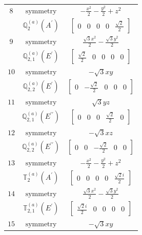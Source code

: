 \documentclass[fleqn,8pt,landscape]{jsarticle}
\begin{document}
\begin{longtable}{ccc}
$ 8 $ & $ \text{symmetry} $ & $ - \frac{x^{2}}{2} - \frac{y^{2}}{2} + z^{2} $ \\
$  $ & $ \mathbb{Q}_{2}^{(a)}(A^{\prime}) $ & $ \begin{bmatrix} 0 & 0 & 0 & 0 & \frac{\sqrt{2}}{2} \end{bmatrix} $ \\ \hline
$ 9 $ & $ \text{symmetry} $ & $ \frac{\sqrt{3} x^{2}}{2} - \frac{\sqrt{3} y^{2}}{2} $ \\
$  $ & $ \mathbb{Q}_{2,1}^{(a)}(E^{\prime}) $ & $ \begin{bmatrix} \frac{\sqrt{2}}{2} & 0 & 0 & 0 & 0 \end{bmatrix} $ \\ \hline
$ 10 $ & $ \text{symmetry} $ & $ - \sqrt{3} x y $ \\
$  $ & $ \mathbb{Q}_{2,2}^{(a)}(E^{\prime}) $ & $ \begin{bmatrix} 0 & - \frac{\sqrt{2}}{2} & 0 & 0 & 0 \end{bmatrix} $ \\ \hline
$ 11 $ & $ \text{symmetry} $ & $ \sqrt{3} y z $ \\
$  $ & $ \mathbb{Q}_{2,1}^{(a)}(E^{\prime\prime}) $ & $ \begin{bmatrix} 0 & 0 & 0 & \frac{\sqrt{2}}{2} & 0 \end{bmatrix} $ \\ \hline
$ 12 $ & $ \text{symmetry} $ & $ - \sqrt{3} x z $ \\
$  $ & $ \mathbb{Q}_{2,2}^{(a)}(E^{\prime\prime}) $ & $ \begin{bmatrix} 0 & 0 & - \frac{\sqrt{2}}{2} & 0 & 0 \end{bmatrix} $ \\ \hline
$ 13 $ & $ \text{symmetry} $ & $ - \frac{x^{2}}{2} - \frac{y^{2}}{2} + z^{2} $ \\
$  $ & $ \mathbb{T}_{2}^{(a)}(A^{\prime}) $ & $ \begin{bmatrix} 0 & 0 & 0 & 0 & \frac{\sqrt{2} i}{2} \end{bmatrix} $ \\ \hline
$ 14 $ & $ \text{symmetry} $ & $ \frac{\sqrt{3} x^{2}}{2} - \frac{\sqrt{3} y^{2}}{2} $ \\
$  $ & $ \mathbb{T}_{2,1}^{(a)}(E^{\prime}) $ & $ \begin{bmatrix} \frac{\sqrt{2} i}{2} & 0 & 0 & 0 & 0 \end{bmatrix} $ \\ \hline
$ 15 $ & $ \text{symmetry} $ & $ - \sqrt{3} x y $ \\

\end{longtable}
\end{document}
